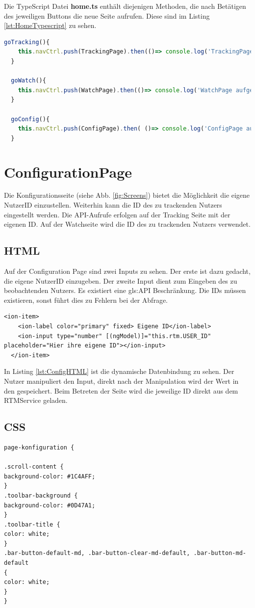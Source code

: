 Die TypeScript Datei \textbf{home.ts} enthält diejenigen Methoden, die nach Betätigen des jeweiligen Buttons die neue Seite aufrufen. Diese sind im Listing \ref{lst:HomeTypescript} zu sehen.

\begin{lstlisting}[float, language=JavaScript, caption= Methoden zur Navigation , label=lst:HomeTypescript]
 goTracking(){
    this.navCtrl.push(TrackingPage).then(()=> console.log('TrackingPage aufgerufen'));
  }

  goWatch(){
    this.navCtrl.push(WatchPage).then(()=> console.log('WatchPage aufgerufen'));
  }

  goConfig(){
    this.navCtrl.push(ConfigPage).then( ()=> console.log('ConfigPage aufgerufen'));
  }
\end{lstlisting}

\section{ConfigurationPage}
\label{ConfigurationPage}
Die Konfigurationsseite (siehe Abb. \ref{fig:Screens}) bietet die Möglichkeit die eigene NutzerID einzustellen. Weiterhin kann die ID des zu trackenden Nutzers eingestellt werden. 
Die API-Aufrufe erfolgen auf der Tracking Seite mit der eigenen ID. Auf der Watchseite wird die ID des zu trackenden Nutzers verwendet.
\subsection{HTML}
Auf der Configuration Page sind zwei Inputs zu sehen. Der erste ist dazu gedacht, die eigene NutzerID einzugeben. Der zweite Input dient zum Eingeben des zu beobachtenden Nutzers.
Es existiert eine \gls{gls:API} Beschränkung. Die IDs müssen existieren, sonst führt dies zu Fehlern bei der Abfrage.
\begin{lstlisting}[float, language=HTML5, caption= Input mittels Databinding , label=lst:ConfigHTML]
 <ion-item>
    <ion-label color="primary" fixed> Eigene ID</ion-label>
    <ion-input type="number" [(ngModel)]="this.rtm.USER_ID" placeholder="Hier ihre eigene ID"></ion-input>
  </ion-item>
\end{lstlisting}
In Listing \ref{lst:ConfigHTML} ist die dynamische Datenbindung zu sehen. Der Nutzer manipuliert den Input, direkt nach der Manipulation wird der Wert in den  gespeichert. Beim Betreten der Seite wird die jeweilige ID direkt aus dem RTMService geladen. 
\subsection{CSS}
\begin{lstlisting}[float, language=HTML5, caption=Stylesheet für die ConfigurationPage , label=lst:ConfigCSS]
page-konfiguration {

.scroll-content {
background-color: #1C4AFF;
}
.toolbar-background {
background-color: #0D47A1;
}
.toolbar-title {
color: white;
}
.bar-button-default-md, .bar-button-clear-md-default, .bar-button-md-default
{
color: white;
}
}
\end{lstlisting}

